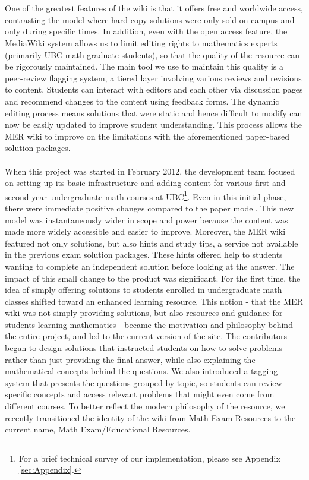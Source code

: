 \documentclass{primus}
\begin{document}
\\\\
\noindent{}One of the greatest features of the wiki is that it offers free and worldwide access, contrasting the model where hard-copy solutions were only sold on campus and only during specific times.  In addition, even with the open access feature, the MediaWiki system allows us to limit editing rights to mathematics experts (primarily UBC math graduate students), so that the quality of the resource can be rigorously maintained.  The main tool we use to maintain this quality is a peer-review flagging system, a tiered layer involving various reviews and revisions to content.  Students can interact with editors and each other via discussion pages and recommend changes to the content using feedback forms.  The dynamic editing process means solutions that were static and hence difficult to modify can now be easily updated to improve student understanding.  This process allows the MER wiki to improve on the limitations with the aforementioned paper-based solution packages.
\\\\
\noindent{}When this project was started in February 2012, the development team focused on setting up its basic infrastructure and adding content for various first and second year undergraduate math courses at UBC\footnote{For a brief technical survey of our implementation, please see Appendix \ref{sec:Appendix}.
}.   Even in this initial phase, there were immediate positive changes compared to the paper model.  This new model was instantaneously wider in scope and power because the content was made more widely accessible and easier to improve.  Moreover, the MER wiki featured not only solutions, but also hints and study tips, a service not available in the previous exam solution packages.  These hints offered help to students wanting to complete an independent solution before looking at the answer.  The impact of this small change to the product was significant. For the first time, the idea of simply offering solutions to students enrolled in undergraduate math classes shifted toward an enhanced learning resource.  
This notion - that the MER wiki was not simply providing solutions, but also resources and guidance for students learning mathematics - became the motivation and philosophy behind the entire project, and led to the current version of the site.  The contributors began to design solutions that instructed students on how to solve problems rather than just providing the final answer, while also explaining the mathematical concepts behind the questions.  We also introduced a tagging system that presents the questions grouped by topic, so students can review specific concepts and access relevant problems that might even come from different courses.  To better reflect the modern philosophy of the resource, we recently transitioned the identity of the wiki from Math Exam Resources to the current name, Math Exam/Educational Resources.
\end{document}
